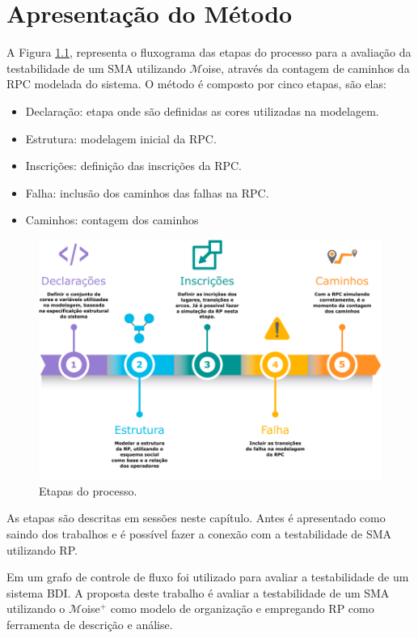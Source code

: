 \chapter{Apresentação do Método}

A Figura \ref{fig:4-fluxograma}, representa o fluxograma das etapas do processo para a avaliação da testabilidade de um SMA utilizando $\mathcal{M}$oise, através da contagem de caminhos da RPC modelada do sistema. O método é composto por cinco etapas, são elas:

\begin{itemize}
    \item Declaração: etapa onde são definidas as cores utilizadas na modelagem.
    \item Estrutura: modelagem inicial da RPC.
    \item Inscrições: definição das inscrições da RPC.
    \item Falha: inclusão dos caminhos das falhas na RPC.
    \item Caminhos: contagem dos caminhos
\end{itemize}

\begin{figure}[ht]
\centering
\includegraphics[scale=0.9]{imagens/4-fluxograma.pdf}
\caption{Etapas do processo.}
\label{fig:4-fluxograma}
\end{figure}

As etapas são descritas em sessões neste capítulo. Antes é apresentado como saindo dos trabalhos \cite{winikoff2014testability} e \cite{winikoff2017bdi} é possível fazer a conexão com a testabilidade de SMA utilizando RP.

Em \cite{winikoff2014testability} um grafo de controle de fluxo foi utilizado para avaliar a testabilidade de um sistema BDI. A proposta deste trabalho é avaliar a testabilidade de um SMA utilizando o $\mathcal{M}$oise$^{+}$ como modelo de organização e empregando RP como ferramenta de descrição e análise.

